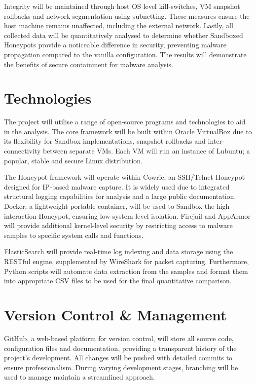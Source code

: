 \documentclass[a4paper,12pt,oneside]{book}			%
\begin{document}
Integrity will be maintained through host OS level kill-switches, VM snapshot rollbacks and network segmentation using subnetting. These measures ensure the host machine remains unaffected, including the external network. Lastly, all collected data will be quantitatively analysed to determine whether Sandboxed Honeypots provide a noticeable difference in security, preventing malware propagation compared to the vanilla configuration. The results will demonstrate the benefits of secure containment for malware analysis.


\section{Technologies}\label{sec:technologies}

The project will utilise a range of open-source programs and technologies to aid in the analysis. The core framework will be built within Oracle VirtualBox due to its flexibility for Sandbox implementations, snapshot rollbacks and inter-connectivity between separate VMs. Each VM will run an instance of Lubuntu; a popular, stable and secure Linux distribution.

The Honeypot framework will operate within Cowrie, an SSH/Telnet Honeypot designed for IP-based malware capture. It is widely used due to integrated structural logging capabilities for analysis and a large public documentation. Docker, a lightweight portable container, will be used to Sandbox the high-interaction Honeypot, ensuring low system level isolation. Firejail and AppArmor will provide additional kernel-level security by restricting access to malware samples to specific system calls and functions. 

ElasticSearch will provide real-time log indexing and data storage using the RESTful engine, supplemented by WireShark for packet capturing. Furthermore, Python scripts will automate data extraction from the samples and format them into appropriate CSV files to be used for the final quantitative comparison. 

\section{Version Control \&{} Management}\label{sec:versionControl}

GitHub, a web-based platform for version control, will store all source code, configuration files and documentation, providing a transparent history of the project’s development. All changes will be pushed with detailed commits to ensure professionalism. During varying development stages, branching will be used to manage maintain a streamlined approach.
\end{document}
